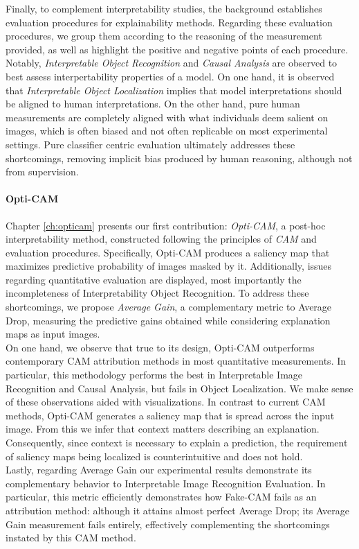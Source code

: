 \noindent Finally, to complement interpretability studies, the background establishes
evaluation procedures for explainability methods. Regarding these evaluation procedures, we group 
them according to the reasoning of the measurement provided, as well as highlight the positive 
and negative points of each procedure. Notably, \emph{Interpretable Object Recognition} and 
\emph{Causal Analysis} are observed to best assess interpertability properties of a model. On one 
hand, it is observed that \emph{Interpretable Object Localization} implies that model 
interpretations should be aligned to human interpretations. On the other hand, pure human 
measurements are completely aligned with what individuals deem salient on images, which is often 
biased and not often replicable on most experimental settings. Pure classifier centric evaluation 
ultimately addresses these shortcomings, removing implicit bias produced by human reasoning, 
although not from supervision.\\

\paragraph{Opti-CAM}
\noindent Chapter \ref{ch:opticam} presents our first contribution: \emph{Opti-CAM}, a post-hoc 
interpretability method, constructed following the principles of \emph{CAM} and evaluation 
procedures. Specifically, Opti-CAM produces a saliency map that maximizes predictive probability 
of images masked by it. Additionally, issues regarding quantitative evaluation are displayed, 
most importantly the incompleteness of Interpretability Object Recognition. To address these 
shortcomings, we propose \emph{Average Gain}, a complementary metric to Average Drop, measuring 
the predictive gains obtained while considering explanation maps as input images.\\

\noindent On one hand, we observe that true to its design, Opti-CAM outperforms contemporary 
CAM attribution methods in most quantitative measurements. In particular, this methodology 
performs the best in Interpretable Image Recognition and Causal Analysis, but fails in Object 
Localization. We make sense of these observations aided with visualizations. In contrast to 
current CAM methods, Opti-CAM generates a saliency map that is spread across the input image. 
From this we infer that context matters describing an explanation. Consequently, since context is 
necessary to explain a prediction, the requirement of saliency maps being localized is 
counterintuitive and does not hold.\\

\noindent Lastly, regarding Average Gain our experimental results demonstrate its complementary 
behavior to Interpretable Image Recognition Evaluation.  In particular, this metric efficiently 
demonstrates how Fake-CAM fails as an attribution method: although it attains almost perfect 
Average Drop; its Average Gain measurement fails entirely, effectively complementing the 
shortcomings instated by this CAM method.
